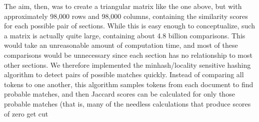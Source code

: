 \documentclass[12pt,]{article}
\begin{document}
The aim, then, was to create a triangular matrix like the one above, but
with approximately 98,000 rows and 98,000 columns, containing the
similarity scores for each possible pair of sections. While this is easy
enough to conceptualize, such a matrix is actually quite large,
containing about 4.8 billion comparisons. This would take an
unreasonable amount of computation time, and most of these comparisons
would be unnecessary since each section has no relationship to most
other sections. We therefore implemented the minhash/locality sensitive
hashing algorithm to detect pairs of possible matches quickly. Instead
of comparing all tokens to one another, this algorithm samples tokens
from each document to find probable matches, and then Jaccard scores can
be calculated for only those probable matches (that is, many of the
needless calculations that produce scores of zero get cut
\end{document}
